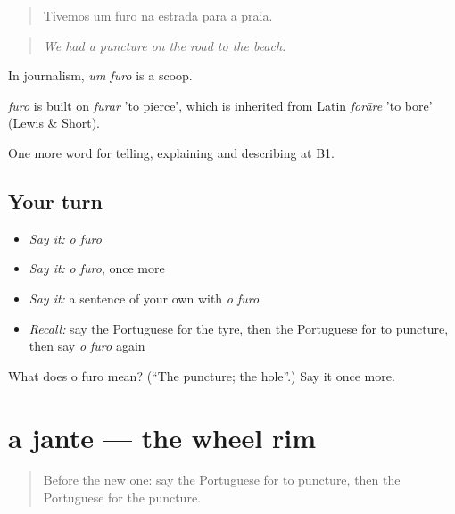 \begin{quote}
Tivemos um furo na estrada para a praia.
\end{quote}

\begin{quote}
\emph{We had a puncture on the road to the beach.}
\end{quote}

In journalism, \emph{um furo} is a scoop.

\begin{cousinweb}
\emph{furo} is built on \emph{furar} 'to pierce', which is inherited from Latin \emph{forāre} 'to bore' (Lewis \& Short).
\end{cousinweb}

\begin{grammarlens}[title={What you've built}]
One more word for telling, explaining and describing at B1.
\end{grammarlens}

\subsection*{Your turn}
\begin{itemize}
\raggedright
  \item \emph{Say it:} \emph{o furo}
  \item \emph{Say it:} \emph{o furo}, once more
  \item \emph{Say it:} a sentence of your own with \emph{o furo}
  \item \emph{Recall:} say the Portuguese for the tyre, then the Portuguese for to puncture, then say \emph{o furo} again
\end{itemize}

\begin{tcolorbox}[breakable,colback=teal!4,colframe=teal!35!black,title={Before you move on}]
What does o furo mean? (\textquotedblleft{}The puncture; the hole\textquotedblright{}.) Say it once more.
\end{tcolorbox}
\section[a jante]{a jante — the wheel rim}

\label{lesson:PT-C405-jante}



\begin{quote}
Before the new one: say the Portuguese for to puncture, then the Portuguese for the puncture.
\end{quote}

